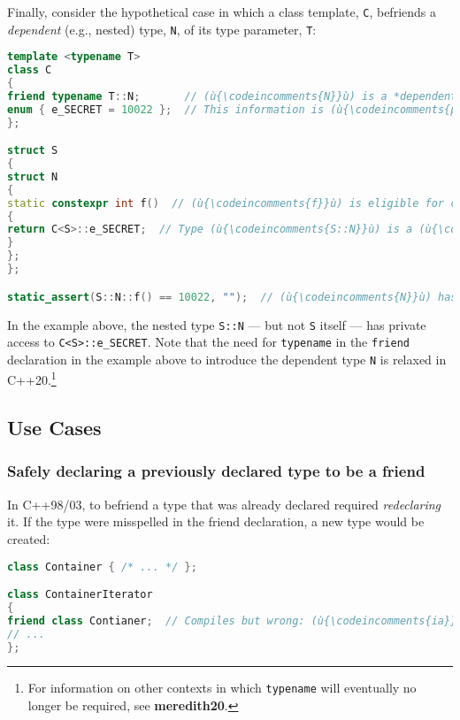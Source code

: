 Finally, consider the hypothetical case in which a class template,
\texttt{C}, befriends a \emph{dependent} (e.g., nested) type, \texttt{N},
of its type parameter, \texttt{T}:

\begin{lstlisting}[language=C++]
template <typename T>
class C
{
friend typename T::N;       // (ù{\codeincomments{N}}ù) is a *dependent* *type* of parameter (ù{\codeincomments{T}}ù).
enum { e_SECRET = 10022 };  // This information is (ù{\codeincomments{private}}ù) to class (ù{\codeincomments{C}}ù).
};

struct S
{
struct N
{
static constexpr int f()  // (ù{\codeincomments{f}}ù) is eligible for compile-time computation.
{
return C<S>::e_SECRET;  // Type (ù{\codeincomments{S::N}}ù) is a (ù{\codeincomments{friend}}ù) of (ù{\codeincomments{C<S>}}ù).
}
};
};

static_assert(S::N::f() == 10022, "");  // (ù{\codeincomments{N}}ù) has (ù{\codeincomments{private}}ù) access to (ù{\codeincomments{C<S>}}ù).
\end{lstlisting}

\noindent In the example above, the nested type \texttt{S::N} --- but not
\texttt{S} itself --- has private access to \texttt{C<S>::e\_SECRET}.
Note that the need for \texttt{typename} in the \texttt{friend}
declaration in the example above to introduce the dependent type \texttt{N} is relaxed
in C++20.{\cprotect\footnote{For information on other contexts in which
\texttt{typename} will eventually no longer be required, see
\mbox{\textbf{meredith20}}.}}

\subsection[Use Cases]{Use Cases}\label{use-cases}

\subsubsection[Safely declaring a previously declared type to be a friend]{Safely declaring a previously declared type to be a friend}\label{safely-declaring-a-previously-declared-type-to-be-a-friend}

In C++98/03, to befriend a type that was already declared required
\emph{redeclaring} it. If the type were misspelled in the friend
declaration, a new type would be created:

\begin{lstlisting}[language=C++]
class Container { /* ... */ };

class ContainerIterator
{
friend class Contianer;  // Compiles but wrong: (ù{\codeincomments{ia}}ù) should have been (ù{\codeincomments{ai}}ù).
// ...
};
\end{lstlisting}

